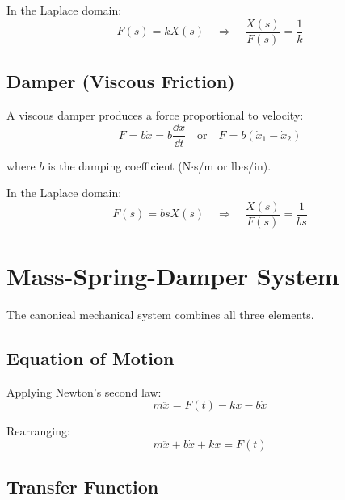 

In the Laplace domain:
\begin{equation}
F(s) = kX(s) \quad \Rightarrow \quad \frac{X(s)}{F(s)} = \frac{1}{k}
\end{equation}

\subsection{Damper (Viscous Friction)}

A viscous damper produces a force proportional to velocity:
\begin{equation}
F = b\dot{x} = b\frac{\dd x}{\dd t} \quad \text{or} \quad F = b(\dot{x}_1 - \dot{x}_2)
\end{equation}

where $b$ is the damping coefficient (N$\cdot$s/m or lb$\cdot$s/in).



In the Laplace domain:
\begin{equation}
F(s) = bsX(s) \quad \Rightarrow \quad \frac{X(s)}{F(s)} = \frac{1}{bs}
\end{equation}

\section{Mass-Spring-Damper System}
\label{sec:msd}

The canonical mechanical system combines all three elements.



\subsection{Equation of Motion}

Applying Newton's second law:
\begin{equation}
m\ddot{x} = F(t) - kx - b\dot{x}
\end{equation}

Rearranging:
\begin{equation}
\boxed{m\ddot{x} + b\dot{x} + kx = F(t)}
\end{equation}

\subsection{Transfer Function}

